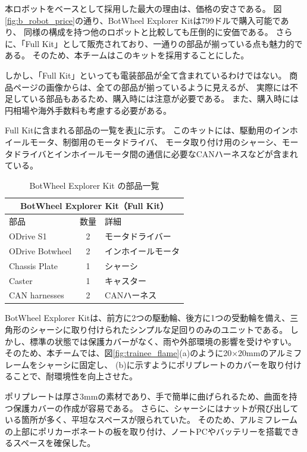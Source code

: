 \documentclass[twocolumn,9pt]{jsproceedings}
\begin{document}
本ロボットをベースとして採用した最大の理由は、価格の安さである。
図\ref{fig:b_robot_price}の通り、BotWheel Explorer Kitは799ドルで購入可能であり、
同様の構成を持つ他のロボットと比較しても圧倒的に安価である。
さらに、「Full Kit」として販売されており、一通りの部品が揃っている点も魅力的である。
そのため、本チームはこのキットを採用することにした。

しかし、「Full Kit」といっても電装部品が全て含まれているわけではない。
商品ページの画像からは、全ての部品が揃っているように見えるが、
実際には不足している部品もあるため、購入時には注意が必要である。
また、購入時には円相場や海外手数料も考慮する必要がある。

Full Kitに含まれる部品の一覧を表\ref{tab:botwheel_kit}に示す。
このキットには、駆動用のインホイールモータ、制御用のモータドライバ、
モータ取り付け用のシャーシ、モータドライバとインホイールモータ間の通信に必要なCANハーネスなどが含まれている。
\begin{table}[h]
  \centering
  \begin{tabular}{|l|c|l|}
      \hline
      \multicolumn{3}{|c|}{\textbf{BotWheel Explorer Kit（Full Kit）}} \\
      \hline
      部品 & 数量 & 詳細 \\
      \hline
      ODrive S1 & 2 & モータドライバー \\
      ODrive Botwheel & 2 & インホイールモータ \\
      Chassis Plate & 1 & シャーシ \\
      Caster & 1 & キャスター \\
      CAN harnesses & 2 & CANハーネス \\
      \hline
  \end{tabular}
  \caption{BotWheel Explorer Kit の部品一覧}
  \label{tab:botwheel_kit}
\end{table}


BotWheel Explorer Kitは、前方に2つの駆動輪、後方に1つの受動輪を備え、三角形のシャーシに取り付けられたシンプルな足回りのみのユニットである。
しかし、標準の状態では保護カバーがなく、雨や外部環境の影響を受けやすい。
そのため、本チームでは、図\ref{fig:trainee_flame}(a)のように20×20mmのアルミフレームをシャーシに固定し、
(b)に示すようにポリプレートのカバーを取り付けることで、耐環境性を向上させた。

ポリプレートは厚さ3mmの素材であり、手で簡単に曲げられるため、曲面を持つ保護カバーの作成が容易である。
さらに、シャーシにはナットが飛び出している箇所が多く、平坦なスペースが限られていた。
そのため、アルミフレームの上部にポリカーボネートの板を取り付け、ノートPCやバッテリーを搭載できるスペースを確保した。
\end{document}
